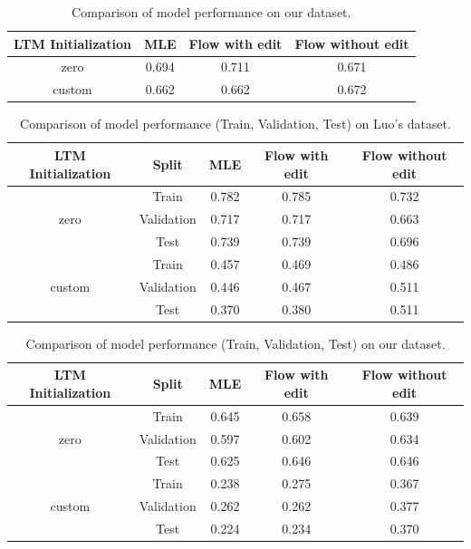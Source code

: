 \begin{table}[h!]
\centering
\begin{tabular}{|c|c|c|c|}
\hline
\textbf{LTM Initialization} & \textbf{MLE} & \textbf{Flow with edit} & \textbf{Flow without edit} \\
\hline
zero & 0.694 & 0.711 & 0.671 \\
custom & 0.662 & 0.662 & 0.672 \\
\hline
\end{tabular}
\caption{Comparison of model performance on our dataset.}
\end{table}

\begin{table}[h!]
\centering
\begin{tabular}{|c|c|c|c|c|}
\hline
\textbf{LTM Initialization} & \textbf{Split} & \textbf{MLE} & \textbf{Flow with edit} & \textbf{Flow without edit} \\
\hline
\multirow{3}{*}{zero} 
& Train& 0.782 & 0.785 & 0.732 \\
& Validation & 0.717 & 0.717 & 0.663 \\
& Test & 0.739 & 0.739 & 0.696 \\
\hline
\multirow{3}{*}{custom} 
& Train& 0.457 & 0.469 & 0.486 \\
& Validation & 0.446 & 0.467 & 0.511 \\
& Test & 0.370 & 0.380 & 0.511 \\
\hline
\end{tabular}
\caption{Comparison of model performance (Train, Validation, Test) on Luo's dataset.}
\end{table}

\begin{table}[h!]
\centering
\begin{tabular}{|c|c|c|c|c|}
\hline
\textbf{LTM Initialization} & \textbf{Split} & \textbf{MLE} & \textbf{Flow with edit} & \textbf{Flow without edit} \\
\hline
\multirow{3}{*}{zero} 
& Train& 0.645 & 0.658 & 0.639 \\
& Validation & 0.597 & 0.602 & 0.634 \\
& Test & 0.625 & 0.646 & 0.646 \\
\hline
\multirow{3}{*}{custom} 
& Train& 0.238 & 0.275 & 0.367 \\
& Validation & 0.262 & 0.262 & 0.377 \\
& Test & 0.224 & 0.234 & 0.370 \\
\hline
\end{tabular}
\caption{Comparison of model performance (Train, Validation, Test) on our dataset.}
\end{table}

